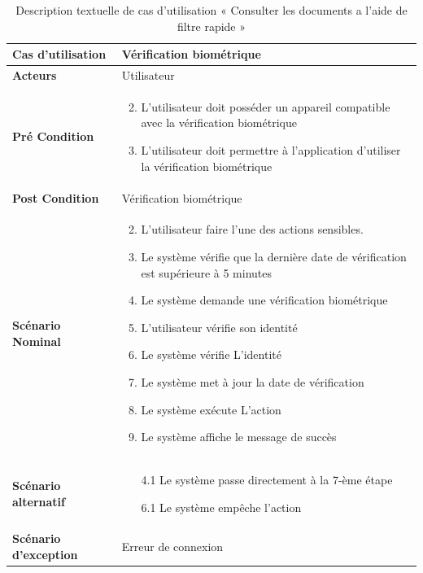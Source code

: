 \begin{longtable}{|p{5cm}|p{10cm}|}
  \caption{Description textuelle de cas d'utilisation « Consulter les documents a l'aide de filtre rapide »} \label{tab:use_case_biometric_verification} \\
\hline
\textbf{Cas d'utilisation}&Vérification biométrique \\
\hline
\textbf{Acteurs}&Utilisateur \\
\hline
\textbf{Pré Condition}&
\vspace{-\baselineskip}
\begin{enumerate}
  \setcounter{enumi}{1}
  \item L'utilisateur doit posséder un appareil compatible avec la vérification biométrique
  \item L'utilisateur doit permettre à l'application d'utiliser la vérification biométrique
\end{enumerate}\\
\hline
\textbf{Post Condition}&Vérification biométrique\\
\hline
\textbf{Scénario Nominal}&
\vspace{-\baselineskip}
\begin{enumerate}
    \setcounter{enumi}{1}
    \item L'utilisateur faire l'une des actions sensibles.
    \item Le système vérifie que la dernière date de vérification est supérieure à 5 minutes 
    \item Le système demande une vérification biométrique
    \item L'utilisateur vérifie son identité
    \item Le système vérifie L'identité 
    \item Le système met à jour la date de vérification
    \item Le système exécute L'action
    \item Le système affiche le message de succès
    
\end{enumerate}\\
\hline
\textbf{Scénario alternatif}&
\vspace{-\baselineskip}
\begin{enumerate}
  \item [4.1] Le système passe directement à la 7-ème étape 
  \item [6.1] Le système empêche l'action  
\end{enumerate}\\
\hline
\textbf{Scénario d'exception}&Erreur de connexion\\
\hline

\end{longtable}

